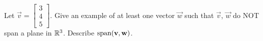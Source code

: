 \documentclass{ximera}
\begin{document}
\begin{problem}
\begin{selectAll}
\end{selectAll}
\end{problem}

\begin{problem}
Let $\vec{v}=\begin{bmatrix}3\\4\\5\end{bmatrix}$.  Give an example of at least one vector $\vec{w}$ such that $\vec{v}$, $\vec{w}$ do NOT span a plane in $\RR^3$.  Describe $\textnormal{span}(\vec{v}, \vec{w})$.
\end{problem}
\end{document}
